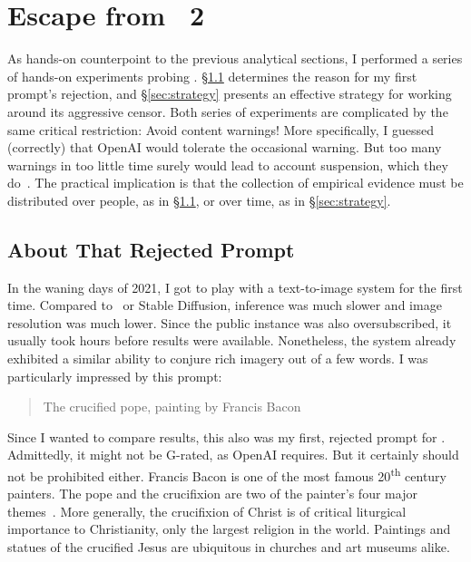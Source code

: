 \section{Escape from \DDAALLEE\ 2}
\label{sec:escape}

As hands-on counterpoint to the previous analytical sections, I performed a
series of hands-on experiments probing \DALLE. \S\ref{sec:crucifixion}
determines the reason for my first prompt's rejection, and \S\ref{sec:strategy}
presents an effective strategy for working around its aggressive censor. Both
series of experiments are complicated by the same critical restriction: Avoid
content warnings! More specifically, I guessed (correctly) that OpenAI would
tolerate the occasional warning. But too many warnings in too little time surely
would lead to account suspension, which they do~\cite{SpicyElephant2022}. The
practical implication is that the collection of empirical evidence must be
distributed over people, as in \S\ref{sec:crucifixion}, or over time, as in
\S\ref{sec:strategy}.


\subsection{About That Rejected Prompt}
\label{sec:crucifixion}

In the waning days of 2021, I got to play with a text-to-image system for the
first time. Compared to \DALLE\ or Stable Diffusion, inference was much slower
and image resolution was much lower. Since the public instance was also
oversubscribed, it usually took hours before results were available.
Nonetheless, the system already exhibited a similar ability to conjure rich
imagery out of a few words. I was particularly impressed by this prompt:

\begin{quote}
\openfat{}The crucified pope, painting by Francis Bacon\closefat{}
\end{quote}

\noindent{}Since I wanted to compare results, this also was my first, rejected
prompt for \DALLE. Admittedly, it might not be G-rated, as OpenAI requires. But
it certainly should not be prohibited either. Francis Bacon is one of the most
famous 20\textsuperscript{th} century painters. The pope and the crucifixion are
two of the painter's four major themes~\cite{Wikipedia2023}. More generally, the
crucifixion of Christ is of critical liturgical importance to Christianity, only
the largest religion in the world. Paintings and statues of the crucified Jesus
are ubiquitous in churches and art museums alike.

